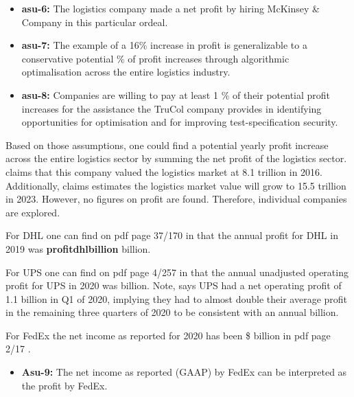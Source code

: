  \begin{itemize}
 	\item \textbf{asu-6:} The logistics company made a net profit by hiring McKinsey \& Company in this particular ordeal.
	\item \textbf{asu-7:} The example of a 16\% increase in profit is generalizable to a conservative potential \textbf{\avgalgooptimisationprofitpercentage}\% of profit increases through algorithmic optimalisation across the entire logistics industry.
	\item \textbf{asu-8:} Companies are willing to pay at least 1 \% of their potential profit increases for the assistance the TruCol company provides in identifying opportunities for optimisation and for improving test-specification security.
\end{itemize}

\noindent Based on those assumptions, one could find a potential yearly profit increase across the entire logistics sector by summing the net profit of the logistics sector. \cite{cips} claims that this company \cite{transparency_market_research} valued the logistics market at 8.1 trillion in 2016. Additionally, \cite{cips} claims \cite{transparency_market_research} estimates the logistics market value will grow to 15.5 trillion in 2023. However, no figures on profit are found. Therefore, individual companies are explored.

For DHL one can find on pdf page 37/170 in \cite{dhl_2019_annual_report} that the annual profit for DHL in 2019 was \textbf{profitdhlbillion} billion.

For UPS one can find on pdf page 4/257 in \cite{ups_2020_annual_report} that the annual unadjusted operating profit for UPS in 2020 was \textbf{\profitupsbillion} billion. Note, \cite{ups_q21_earnings_call} says UPS had a net operating profit of 1.1 billion in Q1 of 2020, implying they had to almost double their average profit in the remaining three quarters of 2020 to be consistent with an annual \textbf{\profitupsbillion} billion.

For FedEx the net income as reported for 2020 has been \$\textbf{\profitfedexbillion} billion in pdf page 2/17 \cite{fedex_2020_annual_report}.

\begin{itemize}
\item \textbf{Asu-9:} The net income as reported (GAAP) by FedEx can be interpreted as the profit by FedEx.
\end{itemize}

